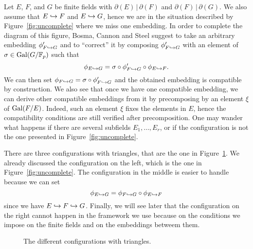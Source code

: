 \documentclass[11pt]{article}
\begin{document}
Let $E$, $F$, and $G$ be finite fields with
$\partial(E)\,|\,\partial(F)$ and
$\partial(F)\,|\,\partial(G)$. We also assume that $E\hookrightarrow F$ and $E\hookrightarrow G$,
hence we are in the situation described by Figure~\ref{fig:uncomplete}
where we miss one embedding. In order to complete the diagram of this
figure, Bosma,
Cannon and Steel suggest to take an arbitrary embedding $\phi_{F\hookrightarrow G}'$ and to
``correct'' it by composing $\phi_{F\hookrightarrow G}'$ with an element of
$\sigma\in\operatorname{Gal}(G/\mathbb{F}_p)$ such that 
\[
  \phi_{E\hookrightarrow G}=\sigma\circ\phi_{F\hookrightarrow G}'\circ\phi_{E\hookrightarrow F}.
\]
We can then set $\phi_{F\hookrightarrow G}=\sigma\circ\phi_{F\hookrightarrow G}'$ and the
obtained embedding is compatible by construction. We also see that once we have
one compatible embedding, we can derive other compatible embeddings from it by
precomposing by an element $\xi$ of $\operatorname{Gal}(F/E)$. Indeed, such an element
$\xi$ fixes the elements in $E$, hence the compatibility conditions are
still verified after precomposition. One may wander what happens
if there are several subfields $E_1, \dots, E_r$, or if the configuration is not
the one presented in Figure~\ref{fig:uncomplete}.

There are three configurations with triangles, that are the one in
Figure~\ref{fig:triangles}. We already discussed the configuration on the
left, which is the one in Figure~\ref{fig:uncomplete}. The configuration in the
middle is easier to handle because we can set 
\[
  \phi_{E\hookrightarrow G}=\phi_{F\hookrightarrow G}\circ\phi_{E\hookrightarrow F}
\]
since we have $E\hookrightarrow F\hookrightarrow G$. Finally, we will see later that the
configuration on the right cannot happen in the framework we use because on the
conditions we impose on the finite fields and on the embeddings betweem them.
  \begin{figure}
    \centering
    \phantom{and}
    \phantom{and}
    \caption{The different configurations with triangles.}
    \label{fig:triangles}
  \end{figure}
\end{document}
